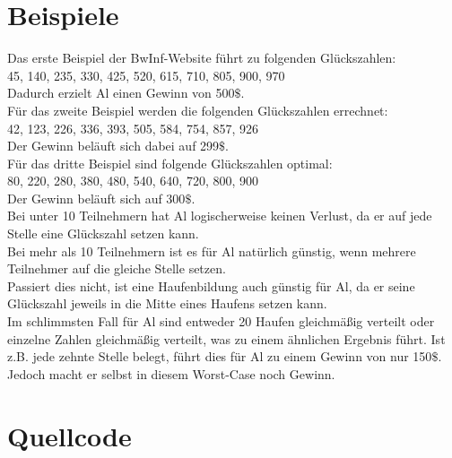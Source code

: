 \documentclass[a4paper,10pt,ngerman]{scrartcl}
\begin{document}
\section{Beispiele}
Das erste Beispiel der BwInf-Website führt zu folgenden Glückszahlen: \\
45, 140, 235, 330, 425, 520, 615, 710, 805, 900, 970 \\
Dadurch erzielt Al einen Gewinn von 500$\$$. \\
Für das zweite Beispiel werden die folgenden Glückszahlen errechnet: \\
42, 123, 226, 336, 393, 505, 584, 754, 857, 926 \\
Der Gewinn beläuft sich dabei auf 299$\$$. \\
Für das dritte Beispiel sind folgende Glückszahlen optimal: \\
80, 220, 280, 380, 480, 540, 640, 720, 800, 900 \\
Der Gewinn beläuft sich auf 300$\$$.
\vspace{5mm} \\
Bei unter 10 Teilnehmern hat Al logischerweise keinen Verlust, da er auf jede Stelle eine Glückszahl setzen kann. \\
Bei mehr als 10 Teilnehmern ist es für Al natürlich günstig, wenn mehrere Teilnehmer auf die gleiche Stelle setzen. \\
Passiert dies nicht, ist eine Haufenbildung auch günstig für Al, da er seine Glückszahl jeweils in die Mitte eines Haufens setzen kann. \\
Im schlimmsten Fall für Al sind entweder 20 Haufen gleichmäßig verteilt oder einzelne Zahlen gleichmäßig verteilt, was zu einem ähnlichen Ergebnis führt. Ist z.B. jede zehnte Stelle belegt, führt dies für Al zu einem Gewinn von nur 150$\$$. Jedoch macht er selbst in diesem Worst-Case noch Gewinn.

\section{Quellcode}

\end{document}
